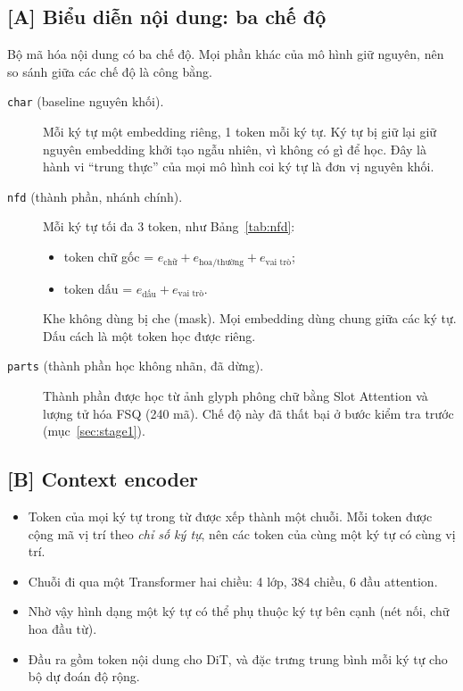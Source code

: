 \documentclass[11pt,a4paper]{article}
\begin{document}
\subsection{[A] Biểu diễn nội dung: ba chế độ}
Bộ mã hóa nội dung có ba chế độ. Mọi phần khác của mô hình giữ nguyên, nên so sánh giữa các chế độ là công bằng.
\begin{description}
\item[\texttt{char} (baseline nguyên khối).] Mỗi ký tự một embedding riêng, 1 token mỗi ký tự. Ký tự bị giữ lại giữ nguyên embedding khởi tạo ngẫu nhiên, vì không có gì để học. Đây là hành vi ``trung thực'' của mọi mô hình coi ký tự là đơn vị nguyên khối.
\item[\texttt{nfd} (thành phần, nhánh chính).] Mỗi ký tự tối đa 3 token, như Bảng~\ref{tab:nfd}:
  \begin{itemize}
  \item token chữ gốc = $e_{\text{chữ}} + e_{\text{hoa/thường}} + e_{\text{vai trò}}$;
  \item token dấu = $e_{\text{dấu}} + e_{\text{vai trò}}$.
  \end{itemize}
  Khe không dùng bị che (mask). Mọi embedding dùng chung giữa các ký tự. Dấu cách là một token học được riêng.
\item[\texttt{parts} (thành phần học không nhãn, đã dừng).] Thành phần được học từ ảnh glyph phông chữ bằng Slot Attention \cite{locatello2020} và lượng tử hóa FSQ \cite{mentzer2024} (240 mã). Chế độ này đã thất bại ở bước kiểm tra trước (mục~\ref{sec:stage1}).
\end{description}

\subsection{[B] Context encoder}
\begin{itemize}
\item Token của mọi ký tự trong từ được xếp thành một chuỗi. Mỗi token được cộng mã vị trí theo \emph{chỉ số ký tự}, nên các token của cùng một ký tự có cùng vị trí.
\item Chuỗi đi qua một Transformer hai chiều: 4 lớp, 384 chiều, 6 đầu attention.
\item Nhờ vậy hình dạng một ký tự có thể phụ thuộc ký tự bên cạnh (nét nối, chữ hoa đầu từ).
\item Đầu ra gồm token nội dung cho DiT, và đặc trưng trung bình mỗi ký tự cho bộ dự đoán độ rộng.
\end{itemize}
\end{document}
